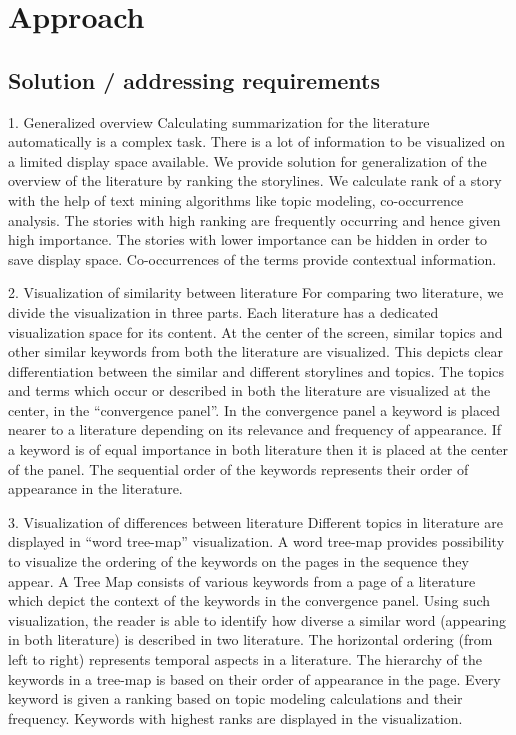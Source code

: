 \chapter{Approach}
\label{approach}

\section{Solution / addressing requirements}


1.	Generalized overview
Calculating summarization for the literature automatically is a complex task. There is a lot of information to be visualized on a limited display space available. We provide solution for generalization of the overview of the literature by ranking the storylines. We calculate rank of a story with the help of text mining algorithms like topic modeling, co-occurrence analysis. The stories with high ranking are frequently occurring and hence given high importance. The stories with lower importance can be hidden in order to save display space. Co-occurrences of the terms provide contextual information.

2.	Visualization of similarity between literature
For comparing two literature, we divide the visualization in three parts. Each literature has a dedicated visualization space for its content. At the center of the screen, similar topics and other similar keywords from both the literature are visualized. This depicts clear differentiation between the similar and different storylines and topics. The topics and terms which occur or described in both the literature are visualized at the center, in the “convergence panel”.  In the convergence panel a keyword is placed nearer to a literature depending on its relevance and frequency of appearance. If a keyword is of equal importance in both literature then it is placed at the center of the panel. The sequential order of the keywords represents their order of appearance in the literature.

3.	Visualization of differences between literature
Different topics in literature are displayed in “word tree-map” visualization. A word tree-map provides possibility to visualize the ordering of the keywords on the pages in the sequence they appear. A Tree Map consists of various keywords from a page of a literature which depict the context of the keywords in the convergence panel. Using such visualization, the reader is able to identify how diverse a similar word (appearing in both literature) is described in two literature. The horizontal ordering (from left to right) represents temporal aspects in a literature. The hierarchy of the keywords in a tree-map is based on their order of appearance in the page. Every keyword is given a ranking based on topic modeling calculations and their frequency. Keywords with highest ranks are displayed in the visualization.

